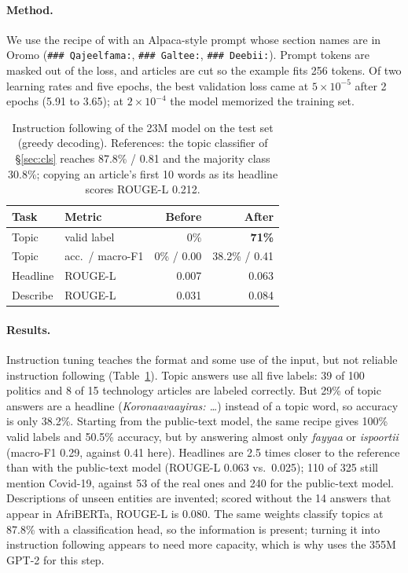 \documentclass[11pt]{article}
\newcommand{\om}[1]{\textit{#1}}
\begin{document}
\paragraph{Method.} We use the recipe of \citet[ch.~7]{raschka2025build} with an Alpaca-style prompt whose section names are in Oromo (\texttt{\#\#\# Qajeelfama:}, \texttt{\#\#\# Galtee:}, \texttt{\#\#\# Deebii:}). Prompt tokens are masked out of the loss, and articles are cut so the example fits 256 tokens. Of two learning rates and five epochs, the best validation loss came at $5\times10^{-5}$ after 2 epochs (5.91 to 3.65); at $2\times10^{-4}$ the model memorized the training set.

\begin{table}[t]
\centering
\small
\setlength{\tabcolsep}{3.5pt}
\begin{tabular}{@{}llrr@{}}
\toprule
Task & Metric & Before & After \\
\midrule
Topic & valid label & 0\% & \textbf{71\%} \\
Topic & acc.\ / macro-F1 & 0\% / 0.00 & 38.2\% / 0.41 \\
Headline & ROUGE-L & 0.007 & 0.063 \\
Describe & ROUGE-L & 0.031 & 0.084 \\
\bottomrule
\end{tabular}
\caption{Instruction following of the 23M model on the test set (greedy decoding). References: the topic classifier of \S\ref{sec:cls} reaches 87.8\% / 0.81 and the majority class 30.8\%; copying an article's first 10 words as its headline scores ROUGE-L 0.212.}
\label{tab:inst}
\end{table}

\paragraph{Results.} Instruction tuning teaches the format and some use of the input, but not reliable instruction following (Table~\ref{tab:inst}). Topic answers use all five labels: 39 of 100 politics and 8 of 15 technology articles are labeled correctly. But 29\% of topic answers are a headline (\om{Koronaavaayiras: \dots}) instead of a topic word, so accuracy is only 38.2\%. Starting from the public-text model, the same recipe gives 100\% valid labels and 50.5\% accuracy, but by answering almost only \om{fayyaa} or \om{ispoortii} (macro-F1 0.29, against 0.41 here). Headlines are 2.5 times closer to the reference than with the public-text model (ROUGE-L 0.063 vs.\ 0.025); 110 of 325 still mention Covid-19, against 53 of the real ones and 240 for the public-text model. Descriptions of unseen entities are invented; scored without the 14 answers that appear in AfriBERTa, ROUGE-L is 0.080. The same weights classify topics at 87.8\% with a classification head, so the information is present; turning it into instruction following appears to need more capacity, which is why \citet{raschka2025build} uses the 355M GPT-2 for this step.
\end{document}
